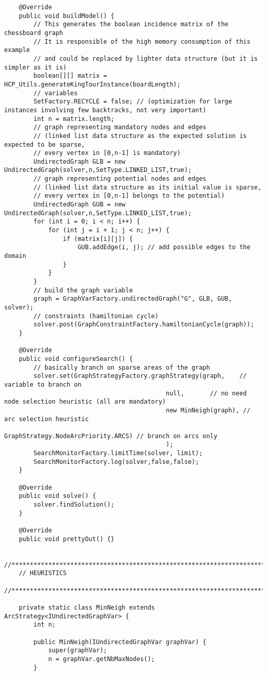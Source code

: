 \documentclass{article}
\begin{document}
\begin{lstlisting}
	@Override
	public void buildModel() {
		// This generates the boolean incidence matrix of the chessboard graph
		// It is responsible of the high memory consumption of this example 
		// and could be replaced by lighter data structure (but it is simpler as it is)
		boolean[][] matrix = HCP_Utils.generateKingTourInstance(boardLength);
		// variables
		SetFactory.RECYCLE = false; // (optimization for large instances involving few backtracks, not very important)
		int n = matrix.length;
		// graph representing mandatory nodes and edges 
		// (linked list data structure as the expected solution is expected to be sparse, 
		// every vertex in [0,n-1] is mandatory)
		UndirectedGraph GLB = new UndirectedGraph(solver,n,SetType.LINKED_LIST,true);
		// graph representing potential nodes and edges 
		// (linked list data structure as its initial value is sparse, 
		// every vertex in [0,n-1] belongs to the potential)
		UndirectedGraph GUB = new UndirectedGraph(solver,n,SetType.LINKED_LIST,true);
		for (int i = 0; i < n; i++) {
			for (int j = i + 1; j < n; j++) {
				if (matrix[i][j]) {
					GUB.addEdge(i, j); // add possible edges to the domain
				}
			}
		}
		// build the graph variable 
		graph = GraphVarFactory.undirectedGraph("G", GLB, GUB, solver);
		// constraints (hamiltonian cycle)
		solver.post(GraphConstraintFactory.hamiltonianCycle(graph));
	}

	@Override
	public void configureSearch() {
		// basically branch on sparse areas of the graph
		solver.set(GraphStrategyFactory.graphStrategy(graph, 	// variable to branch on
											null, 		// no need node selection heuristic (all are mandatory)
											new MinNeigh(graph), // arc selection heuristic
											GraphStrategy.NodeArcPriority.ARCS) // branch on arcs only
											);
		SearchMonitorFactory.limitTime(solver, limit);
		SearchMonitorFactory.log(solver,false,false);
	}

	@Override
	public void solve() {
		solver.findSolution();
	}

	@Override
	public void prettyOut() {}

	//***********************************************************************************
	// HEURISTICS
	//***********************************************************************************

	private static class MinNeigh extends ArcStrategy<IUndirectedGraphVar> {
		int n;

		public MinNeigh(IUndirectedGraphVar graphVar) {
			super(graphVar);
			n = graphVar.getNbMaxNodes();
		}


\end{lstlisting}
\end{document}
